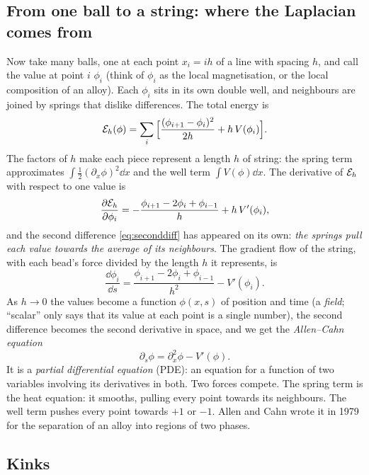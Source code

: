 \subsection{From one ball to a string: where the Laplacian comes from}

Now take many balls, one at each point $x_i=ih$ of a line with spacing $h$, and call the value at point $i$
$\phi_i$ (think of $\phi_i$ as the local magnetisation, or the local composition of an alloy). Each $\phi_i$ sits in
its own double well, and neighbours are joined by springs that dislike differences. The total energy is
\begin{equation}\label{eq:latticeenergy}
  \mathcal{E}_h(\phi)=\sum_i\Big[\frac{(\phi_{i+1}-\phi_i)^2}{2h}+h\,V(\phi_i)\Big].
\end{equation}
The factors of $h$ make each piece represent a length $h$ of string: the spring term approximates
$\int\frac12(\partial_x\phi)^2\dd x$ and the well term $\int V(\phi)\dd x$. The derivative of $\mathcal{E}_h$ with respect to one value is
\[
  \frac{\partial\mathcal{E}_h}{\partial\phi_i}=-\frac{\phi_{i+1}-2\phi_i+\phi_{i-1}}{h}+h\,V'(\phi_i),
\]
and the second difference \eqref{eq:seconddiff} has appeared on its own: \emph{the springs pull each value towards
the average of its neighbours}. The gradient flow of the string, with each bead's force divided by the length
$h$ it represents, is
\begin{equation}\label{eq:latticeAC}
  \frac{\dd\phi_i}{\dd s}=\frac{\phi_{i+1}-2\phi_i+\phi_{i-1}}{h^2}-V'(\phi_i).
\end{equation}
As $h\to0$ the values become a function $\phi(x,s)$ of position and time (a \emph{field}; ``scalar'' only says
that its value at each point is a single number), the second difference becomes the second derivative in
space, and we get the \emph{Allen--Cahn equation}
\begin{equation}\label{eq:allencahn}
  \partial_s\phi=\partial_x^2\phi-V'(\phi).
\end{equation}
It is a \emph{partial differential equation} (PDE): an equation for a function of two variables involving its
derivatives in both. Two forces compete. The spring term is the heat equation: it smooths, pulling every
point towards its neighbours. The well term pushes every point towards $+1$ or $-1$. Allen and Cahn wrote it in
1979 for the separation of an alloy into regions of two phases.

\subsection{Kinks}

